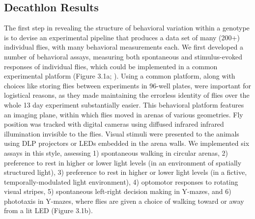 \documentclass[12pt,letterpaper]{article}
\begin{document}
\subsection{Decathlon Results}

The first step in revealing the structure of behavioral variation within a genotype is to devise an experimental pipeline that produces a data set of many (200+) individual flies, with many behavioral measurements each. We first developed a number of behavioral assays, measuring both spontaneous and stimulus-evoked responses of individual flies, which could be implemented in a common experimental platform (Figure 3.1a; \cite{Werkhoven_MARGO_2019}). Using a common platform, along with choices like storing flies between experiments in 96-well plates, were important for logistical reasons, as they made maintaining the errorless identity of flies over the whole 13 day experiment substantially easier. This behavioral platform features an imaging plane, within which flies moved in arenas of various geometries. Fly position was tracked with digital cameras using diffused infrared infrared illumination invisible to the flies. Visual stimuli were presented to the animals using DLP projectors or LEDs embedded in the arena walls. We implemented six assays in this style, assessing 1) spontaneous walking in circular arenas, 2) preference to rest in higher or lower light levels (in an environment of spatially structured light), 3) preference to rest in higher or lower light levels (in a fictive, temporally-modulated light environment), 4) optomotor responses to rotating visual stripes, 5) spontaneous left-right decision making in Y-mazes, and 6) phototaxis in Y-mazes, where flies are given a choice of walking toward or away from a lit LED (Figure 3.1b). 
\end{document}
